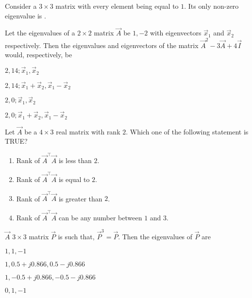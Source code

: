     \item Consider a $3 \times 3$ matrix with every element being equal to $1$. Its only non-zero eigenvalue is \underline{\hspace{2cm}}.
    \hfill{}
    \item Let the eigenvalues of a $2 \times 2$ matrix $\vec{A}$ be $1, -2$ with eigenvectors $\vec{x}_{1}$ and $\vec{x}_{2}$ respectively. Then the eigenvalues and eigenvectors of the matrix $\vec{A}^{2}-3\vec{A}+4\vec{I}$ would, respectively, be
    \hfill{}
    \begin{enumerate}
        \begin{multicols}{2}
            \item $2, 14; \vec{x}_{1}, \vec{x}_{2}$
            \item $2, 14; \vec{x}_{1}+\vec{x}_{2}, \vec{x}_{1}-\vec{x}_{2}$
            \item $2, 0; \vec{x}_{1}, \vec{x}_{2}$
            \item $2, 0; \vec{x}_{1}+\vec{x}_{2}, \vec{x}_{1}-\vec{x}_{2}$
        \end{multicols}
    \end{enumerate}
    \item Let $\vec{A}$ be a $4 \times 3$ real matrix with rank $2$. Which one of the following statement is TRUE?
    \hfill{}
    \begin{enumerate}
        \item Rank of $\vec{A}^{\top} \vec{A}$ is less than $2$.
        \item Rank of $\vec{A}^{\top} \vec{A}$ is equal to $2$.
        \item Rank of $\vec{A}^{\top} \vec{A}$ is greater than $2$.
        \item Rank of $\vec{A}^{\top} \vec{A}$ can be any number between $1$ and $3$.
    \end{enumerate}
    \item $\vec{A}$ $3 \times 3$ matrix $\vec{P}$ is such that, $\vec{P}^3=\vec{P}$. Then the eigenvalues of $\vec{P}$ are
    \hfill{}
    \begin{enumerate}
        \begin{multicols}{2}
            \item $1, 1, -1$
            \item $1, 0.5 + j0.866, 0.5 - j0.866$
            \item $1, -0.5 + j0.866, -0.5 - j0.866$
            \item $0, 1, -1$
        \end{multicols}
    \end{enumerate}
